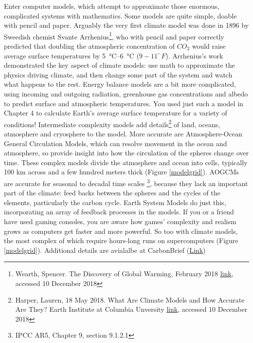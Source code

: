 Enter computer models, which attempt to approximate those enormous, complicated systems with mathematics. Some models are quite simple, doable with pencil and paper. Arguably the very first climate model was done in 1896 by Sweedish chemist Svante Arrhenius\footnote{Wearth, Spencer. The Discovery of Global Warming, February 2018
\href{shttps://history.aip.org/climate/co2.htm\#S1}{link}, accessed 10 December 2018}, who with pencil and paper correctly predicted that doubling the atmospheric concentration of $CO_2$ would raise average surface temperatures by \SIrange{5}{6}{\celsius} ($9-11 ^\circ\,F$). Arrhenius's work demonstrated the key aspect of climate models: use math to approximate the physics driving climate, and then change some part of the system and watch what happens to the rest. Energy balance models are a bit more complicated, using incoming and outgoing radiation, greenhouse gas concentrations and albedo to predict surface and atmospheric temperatures. You used just such a model in Chapter 4 to calculate Earth's average surface temperature for a variety of conditions! Intermediate complexity models add details\footnote{Harper, Lauren, 18 May 2018. What Are Climate Models and How Accurate Are They? Earth Institute at Columbia Unversity \href{https://blogs.ei.columbia.edu/2018/05/18/climate-models-accuracy}{link}, accessed 10 December 2018} of land, oceans, atmosphere and cryosphere to the model. More accurate are Atmosphere-Ocean General Circulation Models, which can resolve movement in the ocean and atmosphere, so provide insight into how the circulation of the spheres change over time. These complex models divide the atmosphere and ocean into cells, typically 100 km across and a few hundred meters thick (Figure \ref{modelgrid}). AOGCMs are accurate for seasonal to decadal time scales \footnote{IPCC AR5, Chapter 9, section 9.1.2.1}, because they lack an important part of the climate: feed backs between the spheres and the cycles of the elements, particularly the carbon cycle. Earth System Models do just this, incorporating an array of feedback processes in the models. If you or a friend have used gaming consoles, you are aware how games' complexity and realism grows as computers get faster and more powerful. So too with climate models, the most complex of which require hours-long runs on supercomputers (Figure \ref{modelgrid}). Additional details are avialalbe at CarbonBrief (\href{https://www.carbonbrief.org/qa-how-do-climate-models-work}{Link})\\
